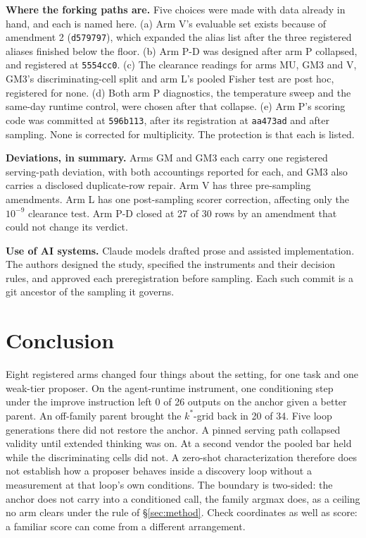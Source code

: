 \textbf{Where the forking paths are.} Five choices were made with data already in hand, and
each is named here. (a) Arm V's evaluable set exists because of amendment 2
(\texttt{d579797}), which expanded the alias list after the three registered aliases finished
below the floor. (b) Arm P-D was designed after arm P collapsed, and registered at
\texttt{5554cc0}. (c) The clearance readings for arms MU, GM3 and V, GM3's
discriminating-cell split and arm L's pooled Fisher test are post hoc, registered for none. (d) Both arm P diagnostics, the temperature sweep and the same-day runtime control,
were chosen after that collapse. (e) Arm P's scoring code was committed at \texttt{596b113},
after its registration at \texttt{aa473ad} and after sampling. None is corrected for
multiplicity. The protection is that each is listed.

\textbf{Deviations, in summary.} Arms GM and GM3 each carry
one registered serving-path deviation, with both accountings reported for each, and GM3 also
carries a disclosed duplicate-row repair. Arm V has three pre-sampling amendments. Arm L has
one post-sampling scorer correction, affecting only the $10^{-9}$ clearance test. Arm P-D
closed at 27 of 30 rows by an amendment that could not change its verdict.

\textbf{Use of AI systems.} Claude models drafted prose and assisted implementation. The
authors designed the study, specified the instruments and their decision rules, and approved
each preregistration before sampling. Each such commit is a git ancestor of the sampling it
governs.

\section{Conclusion}\label{sec:conclusion}

Eight registered arms changed four things about the setting, for one task and one weak-tier
proposer. On the agent-runtime instrument, one conditioning step under the improve instruction
left 0 of 26 outputs on the anchor given a better parent. An off-family parent brought the
$k^*$-grid back in 20 of 34. Five loop generations there did not restore the anchor. A pinned serving path collapsed validity until extended
thinking was on. At a second vendor the pooled bar held while the discriminating cells did
not. A zero-shot characterization therefore
does not establish how a proposer behaves inside a discovery loop without a measurement at
that loop's own conditions. The boundary is two-sided: the anchor does not carry into a
conditioned call, the family argmax does, as a ceiling no arm clears under the rule of
\S\ref{sec:method}. Check coordinates as well as score:
a familiar score can come from a different arrangement.
